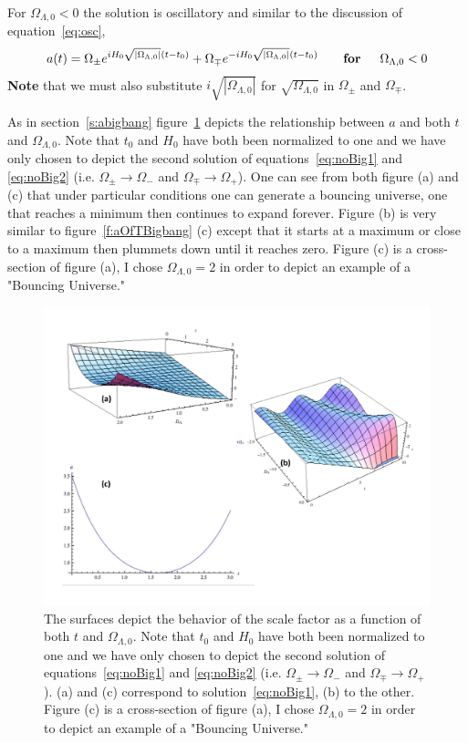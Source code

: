 \documentclass[twoside]{article}
\begin{document}
For $\Omega_{\Lambda,0}<0$ the solution is oscillatory and similar to the discussion of equation~\ref{eq:osc},
\begin{align}
a(t) = \Omega_{\pm}e^{iH_{0}\sqrt{|\Omega_{\Lambda,0}|}(t-t_{0})}+\Omega_{\mp}e^{-iH_{0}\sqrt{|\Omega_{\Lambda,0}|}(t-t_{0})} \qquad\text{\textbf{for \quad $\Omega_{\Lambda,0}<0$}}\label{eq:noBig2}
\end{align}
\textbf{Note} that we must also substitute $i\sqrt{|\Omega_{\Lambda,0}|}$ for $\sqrt{\Omega_{\Lambda,0}}$ in $\Omega_{\pm}$ and $\Omega_{\mp}$.\par

As in section~\ref{s:abigbang} figure~\ref{f:aOfTNoBigbang} depicts the relationship between $a$ and both $t$ and $\Omega_{\Lambda,0}$. Note that $t_{0}$ and $H_{0}$ have both been normalized to one and we have only chosen to depict the second solution of equations~\ref{eq:noBig1} and \ref{eq:noBig2} (i.e. $\Omega_{\pm}\rightarrow\Omega_{-}$ and $\Omega_{\mp}\rightarrow\Omega_{+}$). One can see from both  figure (a) and (c) that under particular conditions one can generate a bouncing universe, one that reaches a minimum then continues to expand forever. Figure (b) is very similar to figure~\ref{f:aOfTBigbang} (c) except that it starts at a maximum or close to a maximum then plummets down until it reaches zero. Figure (c) is a cross-section of figure (a), I chose $\Omega_{\Lambda,0} = 2$ in order to depict an example of a "Bouncing Universe."

\begin{figure}[h!]
  \centering
      \includegraphics[width=1.2\textwidth]{aOfTNoBigBang.pdf}
  \caption{The surfaces depict the behavior of the scale factor as a function of both $t$ and $\Omega_{\Lambda,0}$. Note that $t_{0}$ and $H_{0}$ have both been normalized to one and we have only chosen to depict the second solution of equations~\ref{eq:noBig1} and \ref{eq:noBig2} (i.e. $\Omega_{\pm}\rightarrow\Omega_{-}$ and $\Omega_{\mp}\rightarrow\Omega_{+}$). (a) and (c) correspond to solution~\ref{eq:noBig1}, (b) to the other. Figure (c) is a cross-section of figure (a), I chose $\Omega_{\Lambda,0} = 2$ in order to depict an example of a "Bouncing Universe." }\label{f:aOfTNoBigbang}
\end{figure}
\end{document}
